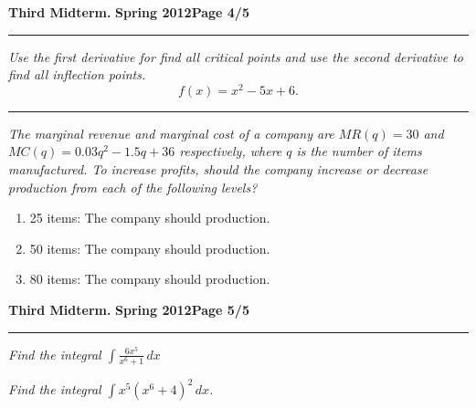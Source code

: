 \documentclass[12pt]{article}
\begin{document}
\hfill{\large\bf Third Midterm.}\hfill{\large\bf
  Spring 2012}\hfill{\large\bf Page 4/5}\hrule

\bigskip
{\problem[10 pts] \em Use the first derivative for find all critical
  points and use the second derivative to find all inflection points.}
\begin{equation*}
f(x)=x^2-5x+6.
\end{equation*}
\vspace{2cm}
\begin{flushright}
\end{flushright}
\hrule
{\problem[10 pts] \em The marginal revenue and marginal cost of a
  company are $MR(q)=30$ and $MC(q)=0.03q^2-1.5q+36$ respectively,
  where $q$ is the number of items manufactured.  To increase profits,
  should the company increase or decrease production from each of the
  following levels?}
\begin{enumerate}
\item 25 items: The company should \framebox[3cm]{\raisebox{0.3cm}{}} production.
\vspace{3cm}
\item 50 items: The company should \framebox[3cm]{\raisebox{0.3cm}{}} production.
\vspace{3cm}
\item 80 items: The company should \framebox[3cm] {\raisebox{0.3cm}{}}
  production.
\end{enumerate}
\newpage

\hfill{\large\bf Third Midterm.}\hfill{\large\bf
  Spring 2012}\hfill{\large\bf Page 5/5}\hrule

\bigskip
{\problem[10 pts] \em Find the integral $\displaystyle{\int
    \frac{6x^5}{x^6+1} \, dx}$} 
\vspace{8cm}
\begin{flushright}
\end{flushright}
{\problem[10 pts] \em Find the integral $\displaystyle{\int
    x^5(x^6+4)^2\, dx}$.}
\vspace{8cm}
\begin{flushright}
\end{flushright}
\end{document}
